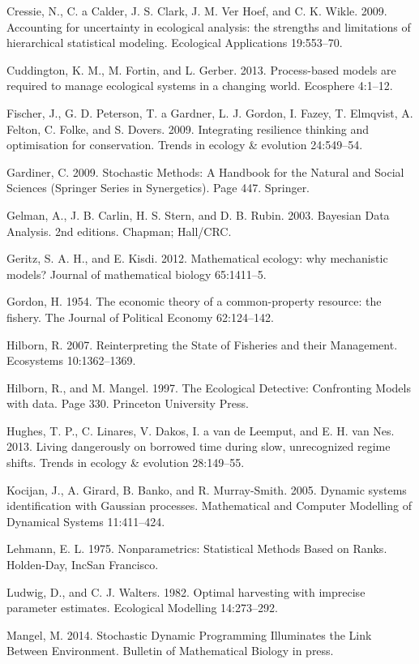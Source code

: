 \documentclass[author-year, 12pt,review]{elsarticle} %
\begin{document}
Cressie, N., C. a Calder, J. S. Clark, J. M. {Ver Hoef}, and C. K.
Wikle. 2009. Accounting for uncertainty in ecological analysis: the
strengths and limitations of hierarchical statistical modeling.
Ecological Applications 19:553--70.

Cuddington, K. M., M. Fortin, and L. Gerber. 2013. Process-based models
are required to manage ecological systems in a changing world. Ecosphere
4:1--12.

Fischer, J., G. D. Peterson, T. a Gardner, L. J. Gordon, I. Fazey, T.
Elmqvist, A. Felton, C. Folke, and S. Dovers. 2009. Integrating
resilience thinking and optimisation for conservation. Trends in ecology
\& evolution 24:549--54.

Gardiner, C. 2009. Stochastic Methods: A Handbook for the Natural and
Social Sciences (Springer Series in Synergetics). Page 447. Springer.

Gelman, A., J. B. Carlin, H. S. Stern, and D. B. Rubin. 2003. Bayesian
Data Analysis. 2nd editions. Chapman; Hall/CRC.

Geritz, S. A. H., and E. Kisdi. 2012. Mathematical ecology: why
mechanistic models? Journal of mathematical biology 65:1411--5.

Gordon, H. 1954. The economic theory of a common-property resource: the
fishery. The Journal of Political Economy 62:124--142.

Hilborn, R. 2007. Reinterpreting the State of Fisheries and their
Management. Ecosystems 10:1362--1369.

Hilborn, R., and M. Mangel. 1997. The Ecological Detective: Confronting
Models with data. Page 330. Princeton University Press.

Hughes, T. P., C. Linares, V. Dakos, I. a van de Leemput, and E. H. van
Nes. 2013. Living dangerously on borrowed time during slow, unrecognized
regime shifts. Trends in ecology \& evolution 28:149--55.

Kocijan, J., A. Girard, B. Banko, and R. Murray-Smith. 2005. Dynamic
systems identification with Gaussian processes. Mathematical and
Computer Modelling of Dynamical Systems 11:411--424.

Lehmann, E. L. 1975. Nonparametrics: Statistical Methods Based on Ranks.
Holden-Day, IncSan Francisco.

Ludwig, D., and C. J. Walters. 1982. Optimal harvesting with imprecise
parameter estimates. Ecological Modelling 14:273--292.

Mangel, M. 2014. Stochastic Dynamic Programming Illuminates the Link
Between Environment. Bulletin of Mathematical Biology in press.
\end{document}
